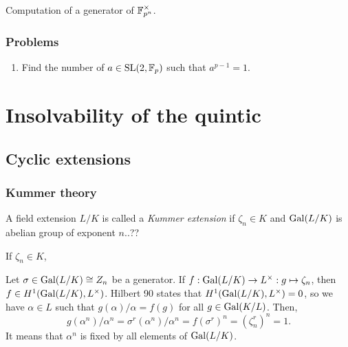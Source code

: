 \documentclass{../note}
\begin{document}
\begin{prb}
Computation of a generator of $\mathbb{F}_{p^n}^\times$.
\end{prb}

\begin{prb}
\end{prb}

\section*{Problems}

\begin{enumerate}
\item Find the number of $a\in\mathrm{SL}(2,\mathbb{F}_p)$ such that $a^{p-1}=1$.
\end{enumerate}













\part{Insolvability of the quintic}


\chapter{Cyclic extensions}




\section{Kummer theory}


\begin{prb}
A field extension $L/K$ is called a \emph{Kummer extension} if $\zeta_n\in K$ and $\operatorname{Gal}(L/K)$ is abelian group of exponent $n$..??
\begin{parts}
\item If $\zeta_n\in K$, 
\end{parts}
\end{prb}
Let $\sigma\in\operatorname{Gal}(L/K)\cong Z_n$ be a generator.
If $f:\operatorname{Gal}(L/K)\to L^\times:g\mapsto\zeta_n$, then $f\in H^1(\operatorname{Gal}(L/K),L^\times)$.
Hilbert 90 states that $H^1(\operatorname{Gal}(L/K),L^\times)=0$, so we have $\alpha\in L$ such that $g(\alpha)/\alpha=f(g)$ for all $g\in\operatorname{Gal}(K/L)$.
Then,
\[g(\alpha^n)/\alpha^n=\sigma^r(\alpha^n)/\alpha^n=f(\sigma^r)^n=(\zeta_n^r)^n=1.\]
It means that $\alpha^n$ is fixed by all elements of $\operatorname{Gal}(L/K)$.
\end{document}
